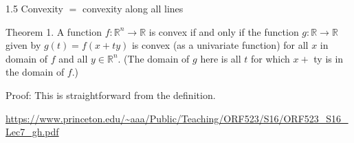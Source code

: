 1.5 Convexity $=$ convexity along all lines

Theorem 1. A function $f: \mathbb{R}^n \rightarrow \mathbb{R}$ is convex if and only if the function $g: \mathbb{R} \rightarrow \mathbb{R}$ given by $g(t)=f(x+t y)$ is convex (as a univariate function) for all $x$ in domain of $f$ and all $y \in \mathbb{R}^n$. (The domain of $g$ here is all $t$ for which $x+$ ty is in the domain of $f$.)

Proof: This is straightforward from the definition.


\url{https://www.princeton.edu/~aaa/Public/Teaching/ORF523/S16/ORF523_S16_Lec7_gh.pdf}

